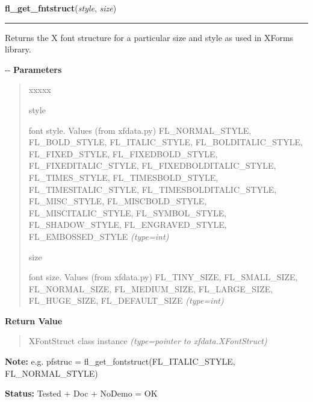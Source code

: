     \label{xformslib:flxbasic:fl_get_fontstruct}

    \vspace{0.5ex}

\hspace{.8\funcindent}\begin{boxedminipage}{\funcwidth}

    \raggedright \textbf{fl\_get\_fntstruct}(\textit{style}, \textit{size})

    \vspace{-1.5ex}

    \rule{\textwidth}{0.5\fboxrule}
\setlength{\parskip}{2ex}

Returns the X font structure for a particular size and style as used
in XForms library.

-{}-
\setlength{\parskip}{1ex}
      \textbf{Parameters}
      \vspace{-1ex}

      \begin{quote}
        \begin{Ventry}{xxxxx}

          \item[style]


font style. Values (from xfdata.py) FL\_NORMAL\_STYLE, FL\_BOLD\_STYLE,
FL\_ITALIC\_STYLE, FL\_BOLDITALIC\_STYLE, FL\_FIXED\_STYLE,
FL\_FIXEDBOLD\_STYLE, FL\_FIXEDITALIC\_STYLE, FL\_FIXEDBOLDITALIC\_STYLE,
FL\_TIMES\_STYLE, FL\_TIMESBOLD\_STYLE, FL\_TIMESITALIC\_STYLE,
FL\_TIMESBOLDITALIC\_STYLE, FL\_MISC\_STYLE, FL\_MISCBOLD\_STYLE,
FL\_MISCITALIC\_STYLE, FL\_SYMBOL\_STYLE, FL\_SHADOW\_STYLE,
FL\_ENGRAVED\_STYLE, FL\_EMBOSSED\_STYLE
            {\it (type=int)}

          \item[size]


font size. Values (from xfdata.py) FL\_TINY\_SIZE, FL\_SMALL\_SIZE,
FL\_NORMAL\_SIZE, FL\_MEDIUM\_SIZE, FL\_LARGE\_SIZE, FL\_HUGE\_SIZE,
FL\_DEFAULT\_SIZE
            {\it (type=int)}

        \end{Ventry}

      \end{quote}

      \textbf{Return Value}
    \vspace{-1ex}

      \begin{quote}

XFontStruct class instance
      {\it (type=pointer to xfdata.XFontStruct)}

      \end{quote}

\textbf{Note:} 
e.g. pfstruc = fl\_get\_fontstruct(FL\_ITALIC\_STYLE, FL\_NORMAL\_STYLE)


\textbf{Status:} 
Tested + Doc + NoDemo = OK


    \end{boxedminipage}

